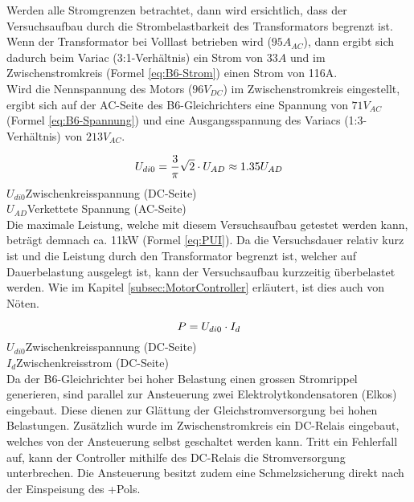 Werden alle Stromgrenzen betrachtet, dann wird ersichtlich, dass der Versuchsaufbau durch die Strombelastbarkeit des Transformators begrenzt ist. Wenn der Transformator bei Volllast betrieben wird ($95A_{AC}$), dann ergibt sich dadurch beim Variac (3:1-Verhältnis) ein Strom von $33A$ und im Zwischenstromkreis (Formel \ref{eq:B6-Strom}) einen Strom von 116A.\\
Wird die Nennspannung des Motors ($96V_{DC}$) im Zwischenstromkreis eingestellt, ergibt sich auf der AC-Seite des B6-Gleichrichters eine Spannung von $71V_{AC}$ (Formel \ref{eq:B6-Spannung}) und eine Ausgangsspannung des Variacs (1:3-Verhältnis) von $213V_{AC}$.

\begin{equation}
\centering
U_{di0}=\frac{3}{\pi}\sqrt{2}\cdot U_{AD}\approx 1.35U_{AD}
\label{eq:B6-Spannung}
\end{equation}
$  U_{di0} $\quad  Zwischenkreisspannung (DC-Seite)      \\
$ U_{AD} $\quad  Verkettete Spannung (AC-Seite)        \\

Die maximale Leistung, welche mit diesem Versuchsaufbau getestet werden kann, beträgt demnach ca. 11kW (Formel \ref{eq:PUI}). Da die Versuchsdauer relativ kurz ist und die Leistung durch den Transformator begrenzt ist, welcher auf Dauerbelastung ausgelegt ist, kann der Versuchsaufbau kurzzeitig überbelastet werden. Wie im Kapitel \ref{subsec:MotorController} erläutert, ist dies auch von Nöten.

\begin{equation}
\centering
P=U_{di0}\cdot I_{d}
\label{eq:PUI}
\end{equation}
$  U_{di0} $\quad  Zwischenkreisspannung (DC-Seite)      \\
$ I_{d} $\quad\quad 	Zwischenkreisstrom (DC-Seite)      \\


Da der B6-Gleichrichter bei hoher Belastung einen grossen Stromrippel generieren, sind parallel zur Ansteuerung zwei Elektrolytkondensatoren (Elkos) eingebaut. Diese dienen zur Glättung der Gleichstromversorgung bei hohen Belastungen. Zusätzlich wurde im Zwischenstromkreis ein DC-Relais eingebaut, welches von der Ansteuerung selbst geschaltet werden kann. Tritt ein Fehlerfall auf, kann der Controller mithilfe des DC-Relais die Stromversorgung unterbrechen. Die Ansteuerung besitzt zudem eine Schmelzsicherung direkt nach der Einspeisung des +Pols.\\

